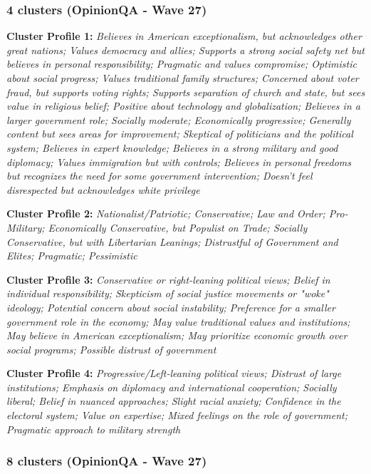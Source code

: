 \documentclass[11pt]{article}
\newcommand{\profiletext}[1]{\textit{#1}}
\begin{document}
\subsubsection{4 clusters (OpinionQA - Wave 27)}

\textbf{Cluster Profile 1:} \profiletext{Believes in American exceptionalism, but acknowledges other great nations; Values democracy and allies; Supports a strong social safety net but believes in personal responsibility; Pragmatic and values compromise; Optimistic about social progress; Values traditional family structures; Concerned about voter fraud, but supports voting rights; Supports separation of church and state, but sees value in religious belief; Positive about technology and globalization; Believes in a larger government role; Socially moderate; Economically progressive; Generally content but sees areas for improvement; Skeptical of politicians and the political system; Believes in expert knowledge; Believes in a strong military and good diplomacy; Values immigration but with controls; Believes in personal freedoms but recognizes the need for some government intervention; Doesn't feel disrespected but acknowledges white privilege}

\textbf{Cluster Profile 2:} \profiletext{Nationalist/Patriotic; Conservative; Law and Order; Pro-Military; Economically Conservative, but Populist on Trade; Socially Conservative, but with Libertarian Leanings; Distrustful of Government and Elites; Pragmatic; Pessimistic}

\textbf{Cluster Profile 3:} \profiletext{Conservative or right-leaning political views; Belief in individual responsibility; Skepticism of social justice movements or "woke" ideology; Potential concern about social instability; Preference for a smaller government role in the economy; May value traditional values and institutions; May believe in American exceptionalism; May prioritize economic growth over social programs; Possible distrust of government}

\textbf{Cluster Profile 4:} \profiletext{Progressive/Left-leaning political views; Distrust of large institutions; Emphasis on diplomacy and international cooperation; Socially liberal; Belief in nuanced approaches; Slight racial anxiety; Confidence in the electoral system; Value on expertise; Mixed feelings on the role of government; Pragmatic approach to military strength}

\subsubsection{8 clusters (OpinionQA - Wave 27)}
\end{document}
